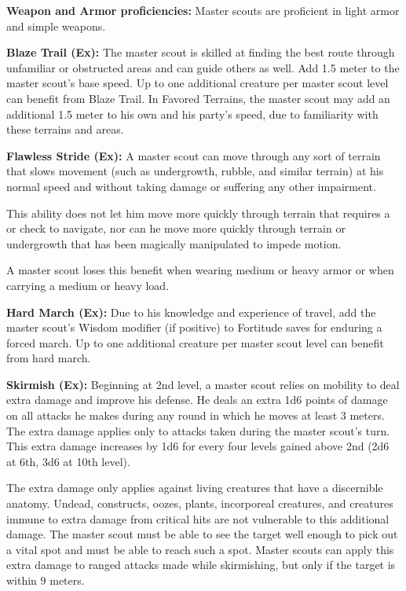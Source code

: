 {
\textbf{Weapon and Armor proficiencies:} Master scouts are proficient in light armor and simple weapons.

\textbf{Blaze Trail (Ex):} The master scout is skilled at finding the best route through unfamiliar or obstructed areas and can guide others as well. Add 1.5 meter to the master scout's base speed. Up to one additional creature per master scout level can benefit from Blaze Trail. In Favored Terrains, the master scout may add an additional 1.5 meter to his own and his party's speed, due to familiarity with these terrains and areas.


\textbf{Flawless Stride (Ex):} A master scout can move through any sort of terrain that slows movement (such as undergrowth, rubble, and similar terrain) at his normal speed and without taking damage or suffering any other impairment.

This ability does not let him move more quickly through terrain that requires a  or  check to navigate, nor can he move more quickly through terrain or undergrowth that has been magically manipulated to impede motion.

A master scout loses this benefit when wearing medium or heavy armor or when carrying a medium or heavy load.

\textbf{Hard March (Ex):} Due to his knowledge and experience of travel, add the master scout's Wisdom modifier (if positive) to Fortitude saves for enduring a forced march. Up to one additional creature per master scout level can benefit from hard march.

\textbf{Skirmish (Ex):} Beginning at 2nd level, a master scout relies on mobility to deal extra damage and improve his defense. He deals an extra 1d6 points of damage on all attacks he makes during any round in which he moves at least 3 meters. The extra damage applies only to attacks taken during the master scout's turn. This extra damage increases by 1d6 for every four levels gained above 2nd (2d6 at 6th, 3d6 at 10th level).

The extra damage only applies against living creatures that have a discernible anatomy. Undead, constructs, oozes, plants, incorporeal creatures, and creatures immune to extra damage from critical hits are not vulnerable to this additional damage. The master scout must be able to see the target well enough to pick out a vital spot and must be able to reach such a spot. Master scouts can apply this extra damage to ranged attacks made while skirmishing, but only if the target is within 9 meters.

}
